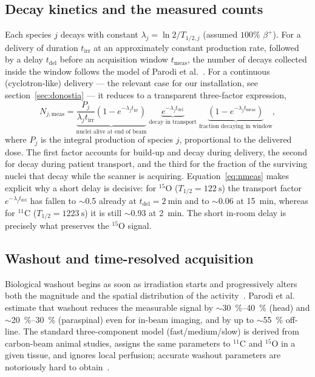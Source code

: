 \documentclass{iopjournal}
\begin{document}
\subsection{Decay kinetics and the measured counts}
\label{sec:kinetics}

Each species $j$ decays with constant $\lambda_j=\ln 2/T_{1/2,j}$ (assumed
$100\%$ $\beta^{+}$). For a delivery of duration $t_{\mathrm{irr}}$ at an
approximately constant production rate, followed by a delay $t_{\mathrm{del}}$
before an acquisition window $t_{\mathrm{meas}}$, the number of decays collected
inside the window follows the model of Parodi et al.~\cite{parodi2008comparison}.
For a continuous (cyclotron-like) delivery --- the relevant case for our
installation, see section~\ref{sec:donostia} --- it reduces to a transparent
three-factor expression,
\begin{equation}
N_{j,\mathrm{meas}} =
\underbrace{\frac{P_j}{\lambda_j t_{\mathrm{irr}}}\left(1-e^{-\lambda_j t_{\mathrm{irr}}}\right)}_{\text{nuclei alive at end of beam}}
\;\underbrace{e^{-\lambda_j t_{\mathrm{del}}}}_{\text{decay in transport}}
\;\underbrace{\left(1-e^{-\lambda_j t_{\mathrm{meas}}}\right)}_{\text{fraction decaying in window}},
\label{eq:nmeas}
\end{equation}
where $P_j$ is the integral production of species $j$, proportional to the
delivered dose. The first factor accounts for build-up and decay during
delivery, the second for decay during patient transport, and the third for the
fraction of the surviving nuclei that decay while the scanner is acquiring.
Equation~\eqref{eq:nmeas} makes explicit why a short delay is decisive: for
$^{15}$O ($T_{1/2}=\SI{122}{\second}$) the transport factor
$e^{-\lambda_j t_{\mathrm{del}}}$ has fallen to $\sim$0.5 already at
$t_{\mathrm{del}}=\SI{2}{\minute}$ and to $\sim$0.06 at \SI{15}{\minute}, whereas
for $^{11}$C ($T_{1/2}=\SI{1223}{\second}$) it is still $\sim$0.93 at
\SI{2}{\minute}. The short in-room delay is precisely what preserves the
$^{15}$O signal.

\subsection{Washout and time-resolved acquisition}

Biological washout begins as soon as irradiation starts and progressively
alters both the magnitude and the spatial distribution of the
activity~\cite{parodi2008comparison}. Parodi et al. estimate that washout
reduces the measurable signal by $\sim$\SIrange{30}{40}{\percent} (head) and
$\sim$\SIrange{20}{30}{\percent} (paraspinal) even for in-beam imaging, and by
up to $\sim$\SI{55}{\percent} off-line. The standard three-component model
(fast/medium/slow) is derived from carbon-beam animal studies, assigns the same
parameters to $^{11}$C and $^{15}$O in a given tissue, and ignores local
perfusion; accurate washout parameters are notoriously hard to
obtain~\cite{zhu2013proton}.
\end{document}
